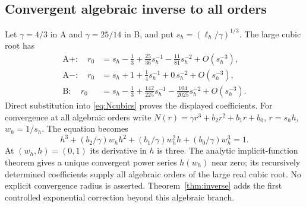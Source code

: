 \subsection{Convergent algebraic inverse to all orders}
Let $\gamma=4/3$ in A and $\gamma=25/14$ in B, and put
$s_h=(\ell_h/\gamma)^{1/3}$. The large cubic root has
\begin{align*}
 \mathrm A+:\quad r_0&=s_h-\tfrac13+\tfrac{25}{36}s_h^{-1}
                         -\tfrac{11}{81}s_h^{-2}+O(s_h^{-3}),\\
 \mathrm A-:\quad r_0&=s_h+1+\tfrac14s_h^{-1}
                         +0\,s_h^{-2}+O(s_h^{-3}),\\
 \mathrm B:\quad r_0&=s_h-\tfrac13+\tfrac{142}{225}s_h^{-1}
                         -\tfrac{104}{2025}s_h^{-2}+O(s_h^{-3}).
\end{align*}
Direct substitution into \eqref{eq:Ncubics} proves the displayed
coefficients. For convergence at all algebraic orders write
$N(r)=\gamma r^3+b_2r^2+b_1r+b_0$, $r=s_h h$, $w_h=1/s_h$.
The equation becomes
\[
 h^3+(b_2/\gamma)w_hh^2+(b_1/\gamma)w_h^2h
 +(b_0/\gamma)w_h^3=1.
\]
At $(w_h,h)=(0,1)$ its derivative in $h$ is three. The analytic
implicit-function theorem gives a unique convergent power series
$h(w_h)$ near zero; its recursively determined coefficients supply
all algebraic orders of the large real cubic root. No explicit
convergence radius is asserted. Theorem~\ref{thm:inverse} adds the
first controlled exponential correction beyond this algebraic branch.

